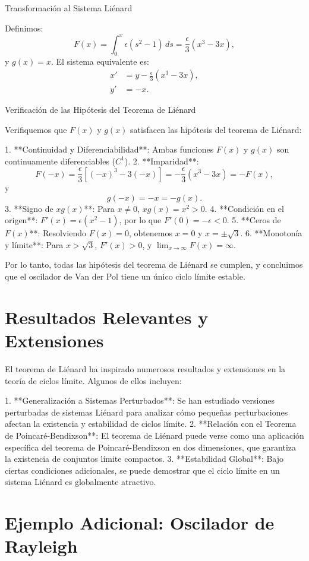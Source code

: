 Transformación al Sistema Liénard

Definimos:
\[
F(x) = \int_0^x \epsilon (s^2 - 1) \, ds = \frac{\epsilon}{3} (x^3 - 3x),
\]
y $g(x) = x$. El sistema equivalente es:
\[
\begin{aligned}
	x' &= y - \frac{\epsilon}{3} (x^3 - 3x), \\
	y' &= -x.
\end{aligned}
\]

Verificación de las Hipótesis del Teorema de Liénard

Verifiquemos que $F(x)$ y $g(x)$ satisfacen las hipótesis del teorema de Liénard:

1. **Continuidad y Diferenciabilidad**: Ambas funciones $F(x)$ y $g(x)$ son continuamente diferenciables ($C^1$).
2. **Imparidad**: 
   \[
   F(-x) = \frac{\epsilon}{3} [(-x)^3 - 3(-x)] = -\frac{\epsilon}{3} (x^3 - 3x) = -F(x),
   \]
   y
   \[
   g(-x) = -x = -g(x).
   \]
3. **Signo de $x g(x)$**: Para $x \neq 0$, $x g(x) = x^2 > 0$.
4. **Condición en el origen**: $F'(x) = \epsilon (x^2 - 1)$, por lo que $F'(0) = -\epsilon < 0$.
5. **Ceros de $F(x)$**: Resolviendo $F(x) = 0$, obtenemos $x = 0$ y $x = \pm \sqrt{3}$.
6. **Monotonía y límite**: Para $x > \sqrt{3}$, $F'(x) > 0$, y $\lim_{x \to \infty} F(x) = \infty$.

Por lo tanto, todas las hipótesis del teorema de Liénard se cumplen, y concluimos que el oscilador de Van der Pol tiene un único ciclo límite estable.

\section{Resultados Relevantes y Extensiones}

El teorema de Liénard ha inspirado numerosos resultados y extensiones en la teoría de ciclos límite. Algunos de ellos incluyen:

1. **Generalización a Sistemas Perturbados**: Se han estudiado versiones perturbadas de sistemas Liénard para analizar cómo pequeñas perturbaciones afectan la existencia y estabilidad de ciclos límite.
2. **Relación con el Teorema de Poincaré-Bendixson**: El teorema de Liénard puede verse como una aplicación específica del teorema de Poincaré-Bendixson en dos dimensiones, que garantiza la existencia de conjuntos límite compactos.
3. **Estabilidad Global**: Bajo ciertas condiciones adicionales, se puede demostrar que el ciclo límite en un sistema Liénard es globalmente atractivo.

\section{Ejemplo Adicional: Oscilador de Rayleigh}

